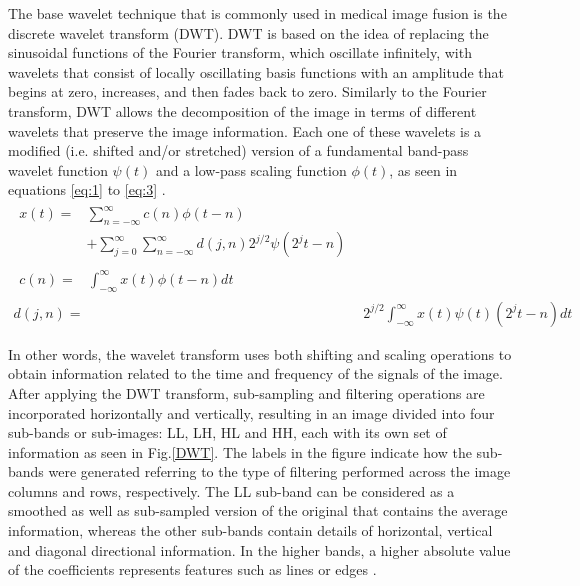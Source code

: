 \documentclass{article}
\begin{document}
The base wavelet technique that is commonly used in medical image fusion is the discrete wavelet transform (DWT). DWT is based on the idea of replacing the sinusoidal functions of the Fourier transform, which oscillate infinitely, with wavelets that consist of locally oscillating basis functions with an amplitude that begins at zero, increases, and then fades back to zero. Similarly to the Fourier transform, DWT allows the decomposition of the image in terms of different wavelets that preserve the image information. Each one of these wavelets is a modified (i.e. shifted and/or stretched) version of a fundamental band-pass wavelet function $\psi(t)$ and a low-pass scaling function $\phi(t)$, as seen in equations \ref{eq:1} to \ref{eq:3} \cite{IvanW.Selesnick.2005}.
\begin{align}
\begin{split}\label{eq:1}
    x(t) ={}& \sum_{n=-\infty}^{\infty} c(n)\phi(t-n)\\
         & + \sum_{j=0}^{\infty}\sum_{n=-\infty}^{\infty} d(j, n)2^{j/2} \psi(2^{j}t-n)
\end{split}\\
\begin{split}\label{eq:2}
    c(n) ={}& \int_{-\infty}^{\infty}x(t)\phi(t-n)dt
\end{split}\\
    d(j,n) ={}& 2^{j/2}\int_{-\infty}^{\infty}x(t)\psi(t)(2^jt-n)dt\label{eq:3}
\end{align}

In other words, the wavelet transform uses both shifting and scaling operations to obtain information related to the time and frequency of the signals of the image. After applying the DWT transform, sub-sampling and filtering operations are incorporated horizontally and vertically, resulting in an image divided into four sub-bands or sub-images: LL, LH, HL and HH, each with its own set of information as seen in Fig.\ref{DWT}. The labels in the figure indicate how the sub-bands were generated referring to the type of filtering performed across the image columns and rows, respectively. The LL sub-band can be considered as a smoothed as well as sub-sampled version of the original that contains the average information, whereas the other sub-bands contain details of horizontal, vertical and diagonal directional information. In the higher bands, a higher absolute value of the coefficients represents features such as lines or edges \cite{M.Haribabu.2017, Pajares.Delacruz.2004}.
\end{document}
